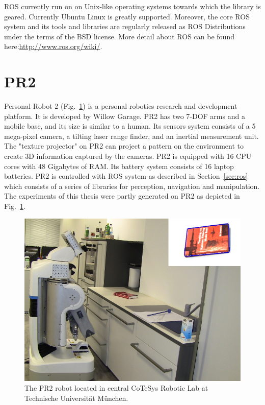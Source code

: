 ROS currently run on on Unix-like operating systems towards which the library is
geared. Currently Ubuntu Linux is greatly supported. Moreover, the core
ROS system and its tools and libraries are regularly released as ROS
Distributions~\cite{rosintroduction} under the terms of the BSD
license. More detail about ROS can be found here:\url{http://www.ros.org/wiki/}.
\section{PR2}
\label{sec:pr2}
Personal Robot 2 (Fig.~\ref{fig:pr2}) is a personal robotics research and development
platform.  It is developed by Willow Garage.  PR2 has two 7-DOF arms and a mobile
base, and its size  is similar to a human. Its sensors system consists of a 5
mega-pixel camera, a tilting laser range finder, and an inertial
measurement unit. The "texture projector" on PR2 can project a pattern
on the environment to create 3D information captured by the
cameras. PR2 is equipped with 16 CPU cores with 48 Gigabytes of
RAM. Its battery system consists of 16 laptop batteries. PR2 is
controlled with ROS system as described in Section~\ref{sec:ros} which
consists of a series of libraries for perception, navigation and
manipulation.
The experiments of this thesis were partly generated on PR2 as
depicted in Fig.~\ref{fig:pr2}.

\begin{figure}[htbp]
  \centering
\includegraphics[width=\linewidth]{images/pr2.jpg}
  \caption[A PR2 robot]{The PR2 robot located in central CoTeSys
    Robotic Lab at Technische Universit\"at M\"unchen.}
  \label{fig:pr2}
\end{figure}

